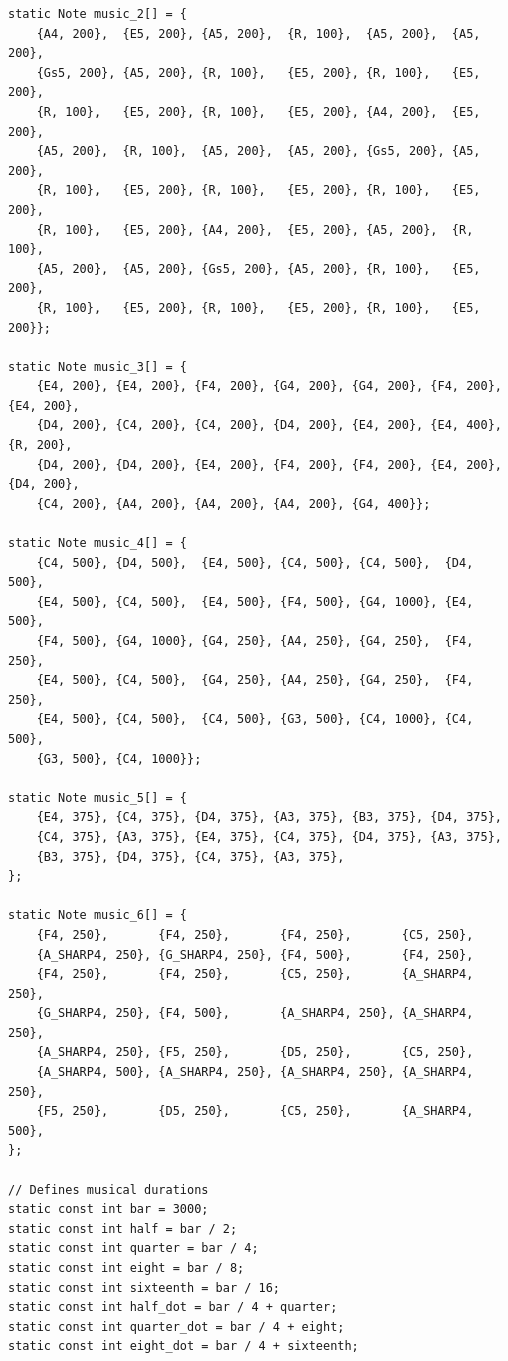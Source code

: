 \documentclass[../main.tex]{subfiles}
\begin{document}
\begin{verbatim}
static Note music_2[] = {
    {A4, 200},  {E5, 200}, {A5, 200},  {R, 100},  {A5, 200},  {A5, 200},
    {Gs5, 200}, {A5, 200}, {R, 100},   {E5, 200}, {R, 100},   {E5, 200},
    {R, 100},   {E5, 200}, {R, 100},   {E5, 200}, {A4, 200},  {E5, 200},
    {A5, 200},  {R, 100},  {A5, 200},  {A5, 200}, {Gs5, 200}, {A5, 200},
    {R, 100},   {E5, 200}, {R, 100},   {E5, 200}, {R, 100},   {E5, 200},
    {R, 100},   {E5, 200}, {A4, 200},  {E5, 200}, {A5, 200},  {R, 100},
    {A5, 200},  {A5, 200}, {Gs5, 200}, {A5, 200}, {R, 100},   {E5, 200},
    {R, 100},   {E5, 200}, {R, 100},   {E5, 200}, {R, 100},   {E5, 200}};

static Note music_3[] = {
    {E4, 200}, {E4, 200}, {F4, 200}, {G4, 200}, {G4, 200}, {F4, 200}, {E4, 200},
    {D4, 200}, {C4, 200}, {C4, 200}, {D4, 200}, {E4, 200}, {E4, 400}, {R, 200},
    {D4, 200}, {D4, 200}, {E4, 200}, {F4, 200}, {F4, 200}, {E4, 200}, {D4, 200},
    {C4, 200}, {A4, 200}, {A4, 200}, {A4, 200}, {G4, 400}};

static Note music_4[] = {
    {C4, 500}, {D4, 500},  {E4, 500}, {C4, 500}, {C4, 500},  {D4, 500},
    {E4, 500}, {C4, 500},  {E4, 500}, {F4, 500}, {G4, 1000}, {E4, 500},
    {F4, 500}, {G4, 1000}, {G4, 250}, {A4, 250}, {G4, 250},  {F4, 250},
    {E4, 500}, {C4, 500},  {G4, 250}, {A4, 250}, {G4, 250},  {F4, 250},
    {E4, 500}, {C4, 500},  {C4, 500}, {G3, 500}, {C4, 1000}, {C4, 500},
    {G3, 500}, {C4, 1000}};

static Note music_5[] = {
    {E4, 375}, {C4, 375}, {D4, 375}, {A3, 375}, {B3, 375}, {D4, 375},
    {C4, 375}, {A3, 375}, {E4, 375}, {C4, 375}, {D4, 375}, {A3, 375},
    {B3, 375}, {D4, 375}, {C4, 375}, {A3, 375},
};

static Note music_6[] = {
    {F4, 250},       {F4, 250},       {F4, 250},       {C5, 250},
    {A_SHARP4, 250}, {G_SHARP4, 250}, {F4, 500},       {F4, 250},
    {F4, 250},       {F4, 250},       {C5, 250},       {A_SHARP4, 250},
    {G_SHARP4, 250}, {F4, 500},       {A_SHARP4, 250}, {A_SHARP4, 250},
    {A_SHARP4, 250}, {F5, 250},       {D5, 250},       {C5, 250},
    {A_SHARP4, 500}, {A_SHARP4, 250}, {A_SHARP4, 250}, {A_SHARP4, 250},
    {F5, 250},       {D5, 250},       {C5, 250},       {A_SHARP4, 500},
};

// Defines musical durations
static const int bar = 3000;
static const int half = bar / 2;
static const int quarter = bar / 4;
static const int eight = bar / 8;
static const int sixteenth = bar / 16;
static const int half_dot = bar / 4 + quarter;
static const int quarter_dot = bar / 4 + eight;
static const int eight_dot = bar / 4 + sixteenth;


\end{verbatim}
\end{document}
